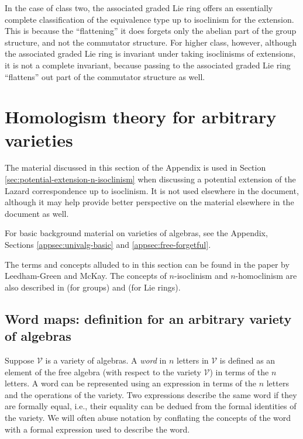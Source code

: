 In the case of class two, the associated graded Lie ring offers an
essentially complete classification of the equivalence type up to
isoclinism for the extension. This is because the ``flattening'' it
does forgets only the abelian part of the group structure, and not the
commutator structure. For higher class, however, although the
associated graded Lie ring is invariant under taking isoclinisms of
extensions, it is not a complete invariant, because passing to the
associated graded Lie ring ``flattens'' out part of the commutator
structure as well.

\section{Homologism theory for arbitrary varieties}\label{appsec:homologism-theory}

The material discussed in this section of the Appendix is used in
Section \ref{sec:potential-extension-n-isoclinism} when discussing a
potential extension of the Lazard correspondence up to isoclinism. It
is not used elsewhere in the document, although it may help provide
better perspective on the material elsewhere in the document as well.

For basic background material on varieties of algebras, see the
Appendix, Sections \ref{appsec:univalg-basic} and
\ref{appsec:free-forgetful}.

The terms and concepts alluded to in this section can be found in the
paper \cite{Baerinvariantsandisolosigms} by Leedham-Green and
McKay. The concepts of $n$-isoclinism and $n$-homoclinism are also
described in \cite{Hekster} (for groups) and \cite{Moghaddametal} (for
Lie rings).

\subsection{Word maps: definition for an arbitrary variety of algebras}\label{appsec:word-maps}

Suppose $\mathcal{V}$ is a variety of algebras. A {\em word} in $n$
letters in $\mathcal{V}$ is defined as an element of the free algebra
(with respect to the variety $\mathcal{V}$) in terms of the $n$
letters. A word can be represented using an expression in terms of the
$n$ letters and the operations of the variety. Two expressions
describe the same word if they are formally equal, i.e., their
equality can be dedued from the formal identities of the variety. We
will often abuse notation by conflating the concepts of the word with
a formal expression used to describe the word.

